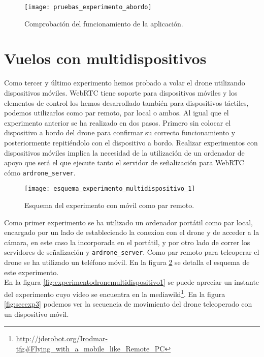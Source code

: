 \begin{figure}[h!]
\centering
\texttt{[image: pruebas\_experimento\_abordo]}
\caption{Comprobación del funcionamiento de la aplicación.}
\label{fig:pruebaexperimentoabordo}
\end{figure}

\section{Vuelos con multidispositivos}

Como tercer y último experimento hemos probado a volar el drone utilizando dispositivos móviles. WebRTC tiene soporte para dispositivos móviles y los elementos de control los hemos desarrollado también para dispositivos táctiles, podemos utilizarlos como par remoto, par local o ambos. Al igual que el experimento anterior se ha realizado en dos pasos. Primero sin colocar el dispositivo a bordo del drone para confirmar su correcto funcionamiento y posteriormente repitiéndolo con el dispositivo a bordo. Realizar experimentos con dispositivos móviles implica la necesidad de la utilización de un ordenador de apoyo que será el que ejecute tanto el servidor de señalización para WebRTC cómo \texttt{ardrone\_server}.\\


\begin{figure}[h!]
\centering
\texttt{[image: esquema\_experimento\_multidispositivo\_1]}
\caption{Esquema del experimento con móvil como par remoto.}
\label{fig:esquemaexperimentomultidispositivo}
\end{figure}


Como primer experimento se ha utilizado un ordenador portátil como par local, encargado por un lado de estableciendo la conexion con el drone y de acceder a la cámara, en este caso la incorporada en el portátil, y por otro lado de correr los servidores de señalización y \texttt{ardrone\_server}. Como par remoto para teleoperar el drone se ha utilizado un teléfono móvil. En la figura \ref{fig:esquemaexperimentomultidispositivo} se detalla el esquema de este experimento.\\


En la figura \ref{fig:experimentodronemultidispositivo1} se puede apreciar un instante del experimento cuyo vídeo se encuentra en la mediawiki\footnote{\url{http://jderobot.org/Irodmar-tfg\#Flying\_with\_a\_mobile\_like\_Remote\_PC}}. En la figura \ref{fig:secexp3} podemos ver la secuencia de movimiento del drone teleoperado con un dispositivo móvil.\\

